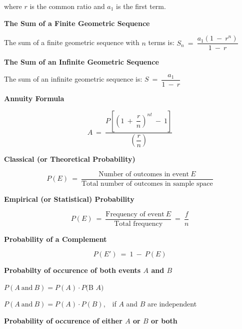 \documentclass{article}
\begin{document}
\begin{large}
\vspace{-0.2in}
\hspace{0.1in} where $r$ is the common ratio and $a_{1}$ is the first term.

\textbf{The Sum of a Finite Geometric Sequence}

\vspace{-0.15in}
\hspace{0.1in} The sum of a finite geometric sequence with $n$ terms is:
\hspace{0.8in} $S_{n}\ =\ \dfrac{a_{1}(1\ -\ r^{n})}{1\ -\ r}$

\textbf{The Sum of an Infinite Geometric Sequence}

\vspace{-0.15in}
\hspace{0.1in} The sum of an infinite geometric sequence is:
\hspace{1.6in} $S\ =\ \dfrac{a_{1}}{1\ -\ r}$


\textbf{Annuity Formula}

\vspace{-0.4in}
\hspace{0.1in} \[A\ =\ \dfrac{P\left[\left(1\ +\ \dfrac{r}{n}\right)^{nt}\ -\ 1\right]}{\left(\dfrac{r}{n}\right)}\]

\textbf{Classical (or Theoretical Probability)}

\vspace{-0.3in} \[P(E)\ =\ \dfrac{\text{Number of outcomes in event}\ E}{\text{Total number of outcomes in sample space}}\]

\textbf{Empirical (or Statistical) Probability}

\vspace{-0.3in} \[P(E)\ =\ \dfrac{\text{Frequency of event}\ E}{\text{Total frequency}}\ =\ \dfrac{f}{n}\]


\textbf{Probability of a Complement}

\vspace{-0.5in} \[P(E')\ =\ 1\ -\ P(E)\]

\textbf{Probabilty of occurence of both events $A$ and $B$}

\hspace{2.5in} $P(A\ \text{and}\ B) = P(A)\cdot P($B \textbar $A)$

\hspace{1.5in} $P(A\ \text{and}\ B) = P(A)\cdot P(B)$,\ \ if $A$ and $B$ are independent

\textbf{Probability of occurence of either $A$ or $B$ or both}


\end{large}
\end{document}
